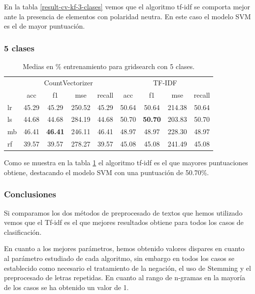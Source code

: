 En la tabla \ref{result-cv-kf-3-clases} vemos que el algoritmo tf-idf se comporta mejor ante la presencia de elementos con polaridad neutra. En este caso el modelo SVM es el de mayor puntuación.

\subsubsection{5 clases}

\begin{table}[H]
	\centering
	\begin{tabular}{|l|cccc|cccc|}
		\hline
		& \multicolumn{4}{c|}{CountVectorizer} & \multicolumn{4}{c|}{TF-IDF} \\
		\cline{2-9}
		&    acc &     f1 &    mse &  recall & acc &     f1 &    mse &  recall \\
		\hline
		lr      &  45.29 &  45.29 &  250.52 &   45.29 &  50.64 &  50.64 &  214.38 &   50.64 \\
		ls      &  44.68 &  44.68 &  284.19 &   44.68 &  50.70 &  \textbf{50.70} &  203.83 &   50.70 \\
		mb      &  46.41 &  \textbf{46.41} &  246.11 &   46.41 &  48.97 &  48.97 &  228.30 &   48.97 \\
		rf      &  39.57 &  39.57 &  278.27 &   39.57 &  45.08 &  45.08 &  241.49 &   45.08 \\
		\hline
	\end{tabular}
	\caption{Medias en \% entrenamiento para gridsearch con 5 clases.}
	\label{result-cv-kf-5-clases}
\end{table}

Como se muestra en la tabla \ref{result-cv-kf-5-clases} el algoritmo tf-idf es el que mayores puntuaciones obtiene, destacando el modelo SVM con una puntuación de 50.70\%.


\subsubsection{Conclusiones}

Si comparamos los dos métodos de preprocesado de textos que hemos utilizado vemos que el Tf-idf es el que mejores resultados obtiene para todos los casos de clasificación.

En cuanto a los mejores parámetros, hemos obtenido valores dispares en cuanto al parámetro estudiado de cada algoritmo, sin embargo en todos los casos se establecido como necesario el tratamiento de la negación, el uso de Stemming y el preprocesado de letras repetidas. En cuanto al rango de n-gramas en la mayoría de los casos se ha obtenido un valor de 1.

